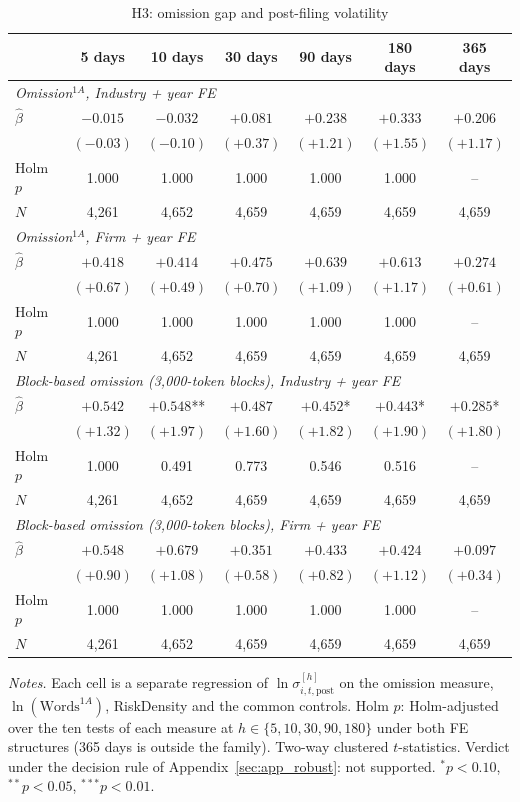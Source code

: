 \begin{table}[htbp]
\centering
\caption{H3: omission gap and post-filing volatility}
\label{tab:silence_main}
\footnotesize
\setlength{\tabcolsep}{3.5pt}
\begin{tabular}{lcccccc}
\toprule
 & 5 days & 10 days & 30 days & 90 days & 180 days & 365 days \\
\midrule
\multicolumn{7}{l}{\emph{Omission$^{1A}$, Industry + year FE}} \\
$\hat\beta$ & $-0.015$ & $-0.032$ & $+0.081$ & $+0.238$ & $+0.333$ & $+0.206$ \\
 & $(-0.03)$ & $(-0.10)$ & $(+0.37)$ & $(+1.21)$ & $(+1.55)$ & $(+1.17)$ \\
Holm $p$ & 1.000 & 1.000 & 1.000 & 1.000 & 1.000 & -- \\
$N$ & 4,261 & 4,652 & 4,659 & 4,659 & 4,659 & 4,659 \\[3pt]
\multicolumn{7}{l}{\emph{Omission$^{1A}$, Firm + year FE}} \\
$\hat\beta$ & $+0.418$ & $+0.414$ & $+0.475$ & $+0.639$ & $+0.613$ & $+0.274$ \\
 & $(+0.67)$ & $(+0.49)$ & $(+0.70)$ & $(+1.09)$ & $(+1.17)$ & $(+0.61)$ \\
Holm $p$ & 1.000 & 1.000 & 1.000 & 1.000 & 1.000 & -- \\
$N$ & 4,261 & 4,652 & 4,659 & 4,659 & 4,659 & 4,659 \\[3pt]
\multicolumn{7}{l}{\emph{Block-based omission (3{,}000-token blocks), Industry + year FE}} \\
$\hat\beta$ & $+0.542$ & $+0.548$** & $+0.487$ & $+0.452$* & $+0.443$* & $+0.285$* \\
 & $(+1.32)$ & $(+1.97)$ & $(+1.60)$ & $(+1.82)$ & $(+1.90)$ & $(+1.80)$ \\
Holm $p$ & 1.000 & 0.491 & 0.773 & 0.546 & 0.516 & -- \\
$N$ & 4,261 & 4,652 & 4,659 & 4,659 & 4,659 & 4,659 \\[3pt]
\multicolumn{7}{l}{\emph{Block-based omission (3{,}000-token blocks), Firm + year FE}} \\
$\hat\beta$ & $+0.548$ & $+0.679$ & $+0.351$ & $+0.433$ & $+0.424$ & $+0.097$ \\
 & $(+0.90)$ & $(+1.08)$ & $(+0.58)$ & $(+0.82)$ & $(+1.12)$ & $(+0.34)$ \\
Holm $p$ & 1.000 & 1.000 & 1.000 & 1.000 & 1.000 & -- \\
$N$ & 4,261 & 4,652 & 4,659 & 4,659 & 4,659 & 4,659 \\[3pt]
\bottomrule
\end{tabular}
\par\smallskip
\begin{minipage}{\linewidth}\footnotesize
\emph{Notes.} Each cell is a separate regression of $\ln\sigma^{[h]}_{i,t,\mathrm{post}}$ on the omission measure, $\ln(\text{Words}^{1A})$, RiskDensity and the common controls. Holm $p$: Holm-adjusted over the ten tests of each measure at $h\in\{5,10,30,90,180\}$ under both FE structures (365 days is outside the family). Two-way clustered $t$-statistics. Verdict under the decision rule of Appendix~\ref{sec:app_robust}: not supported. $^{*}p<0.10$, $^{**}p<0.05$, $^{***}p<0.01$.
\end{minipage}
\end{table}
